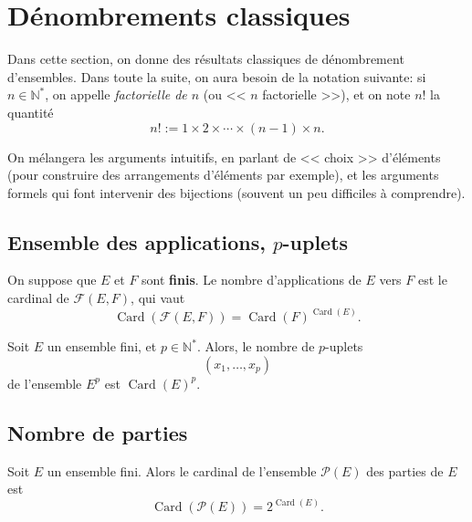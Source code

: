 \documentclass[twoside,11pt]{article}
\newcommand{\N}{\mathbb N}
\DeclareMathOperator{\Card}{\mathrm{Card}}
\theoremstyle{definition}
\theoremstyle{remark}
\theoremstyle{theorem}
\begin{document}
\section{Dénombrements classiques}

Dans cette section, on donne des résultats classiques de dénombrement d'ensembles. Dans toute la suite, on aura besoin de la notation suivante: si $n\in\N^*$, on appelle \textit{factorielle de $n$} (ou << $n$ factorielle >>), et on note $n!$ la quantité
\[
n! := 1\times2\times \cdots \times (n-1)\times n.
\]

On mélangera les arguments intuitifs, en parlant de << choix >> d'éléments (pour construire des arrangements d'éléments par exemple), et les arguments formels qui font intervenir des bijections (souvent un peu difficiles à comprendre).

\subsection{Ensemble des applications, $p$-uplets}

\begin{prop}
	On suppose que $E$ et $F$ sont \textbf{finis}. Le nombre d'applications de $E$ vers $F$ est le cardinal de $\mathcal F(E,F)$, qui vaut
	\[
	\Card(\mathcal{F}(E,F)) = \Card(F)^{\Card(E)}.
	\]
\end{prop}

\begin{prop}
	Soit $E$ un ensemble fini, et $p\in\N^*$. Alors, le nombre de $p$-uplets
	\[ (x_1,\ldots,x_p) \]
	de l'ensemble $E^p$ est $\Card(E)^p$.
\end{prop}

\subsection{Nombre de parties}

\begin{prop}
	Soit $E$ un ensemble fini. Alors le cardinal de l'ensemble $\mathcal{P}(E)$ des parties de $E$ est
	\[ \Card\left(\mathcal P(E)\right) = 2^{\Card(E)}. \]
\end{prop}
\end{document}
